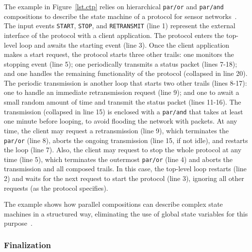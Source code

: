 \documentclass{sigplanconf}
\newcommand{\code}[1] {{\small{\texttt{#1}}}}
\newcommand{\1}{\;}
\newcommand{\2}{\;\;}
\newcommand{\3}{\;\;\;}
\newcommand{\5}{\;\;\;\;\;}
\begin{document}
The example in Figure~\ref{lst.ctp} relies on hierarchical \code{par/or} and 
\code{par/and} compositions to describe the state machine of a protocol for 
sensor networks~\cite{wsn.ctp,ceu.sensys13}.
%
The input events \code{START}, \code{STOP}, and \code{RETRANSMIT} (line 1) 
represent the external interface of the protocol with a client application.
%
The protocol enters the top-level loop and awaits the starting event (line 3).
Once the client application makes a start request, the protocol starts three 
other trails:
one monitors the stopping event (line 5);
one periodically transmits a status packet (lines 7-18);
and one handles the remaining functionality of the protocol (collapsed in line 
20).
%
The periodic transmission is another loop that starts two other trails (lines 
8-17):
one to handle an immediate retransmission request (line 9);
and one to await a small random amount of time and transmit the status packet 
(lines 11-16).
%
The transmission (collapsed in line 15) is enclosed with a \code{par/and} that 
takes at least one minute before looping, to avoid flooding the network with 
packets.
%
At any time, the client may request a retransmission (line 9), which terminates 
the \code{par/or} (line 8), aborts the ongoing transmission (line 15, if not 
idle), and restarts the loop (line 7).
%
Also, the client may request to stop the whole protocol at any time (line 5), 
which terminates the outermost \code{par/or} (line 4) and aborts the 
transmission and all composed trails.
In this case, the top-level loop restarts (line 2) and waits for the next 
request to start the protocol (line 3), ignoring all other requests (as the 
protocol specifies).

The example shows how parallel compositions can describe complex state machines 
in a structured way, eliminating the use of global state variables for this 
purpose~\cite{ceu.sensys13}.

\subsubsection{Finalization}

\end{document}
